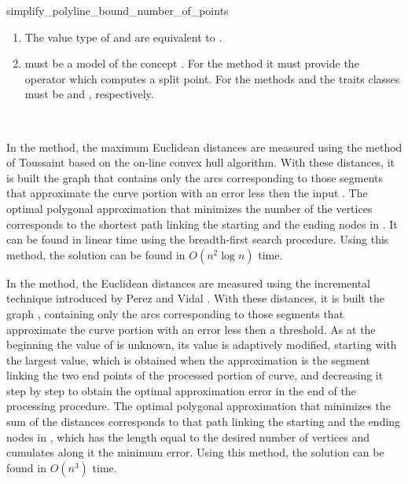 \begin{ccRefFunction}{simplify_polyline_bound_number_of_points}
\begin{enumerate}
   \item    The value type of  and 
            are equivalent to .
   \item    {} must be a model of the concept . For
            the method  it must provide the operator
            which computes a split point. For the methods 
            and  the traits classes must be
             and ,
	    respectively.
\end{enumerate}

\ccSeeAlso

 \\

\ccImplementation


In the  method, the maximum Euclidean
distances are measured using the method of Toussaint \cite{t-capcp-85} based on the
on-line convex hull algorithm. With these distances, it is built the
graph  that contains only the arcs corresponding to those
segments that approximate the curve portion with an error less then
the input . The optimal polygonal approximation that
minimizes the number of the vertices corresponds to the shortest path
linking the starting and the ending nodes in . It can be found
in linear time using the breadth-first search procedure. Using this
method, the solution can be found in $O(n^2 \log n)$ time.

In the  method, the Euclidean distances
are measured using the incremental technique introduced by Perez and
Vidal \cite{cgal:pv-opadc-94}. With these distances, it is built the graph ,
containing only the arcs corresponding to those segments that
approximate the curve portion with an error less then a threshold. As
at the beginning the value of  is unknown, its value is adaptively
modified, starting with the largest value, which is obtained when the
approximation is the segment linking the two end points of the
processed portion of curve, and decreasing it step by step to obtain
the optimal approximation error in the end of the processing
procedure. The optimal polygonal approximation that minimizes the sum
of the distances corresponds to that path linking the starting and the
ending nodes in , which has the length equal to the desired
number of vertices and cumulates along it the minimum error. Using
this method, the solution can be found in $O(n^3)$ time.

\end{ccRefFunction}


